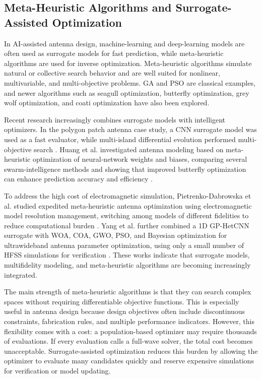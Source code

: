 \documentclass{article}
\begin{document}
\subsection{Meta-Heuristic Algorithms and Surrogate-Assisted Optimization}

In AI-assisted antenna design, machine-learning and deep-learning models are often used as surrogate models for fast prediction, while meta-heuristic algorithms are used for inverse optimization. Meta-heuristic algorithms simulate natural or collective search behavior and are well suited for nonlinear, multivariable, and multi-objective problems. GA and PSO are classical examples, and newer algorithms such as seagull optimization, butterfly optimization, grey wolf optimization, and coati optimization have also been explored.

Recent research increasingly combines surrogate models with intelligent optimizers. In the polygon patch antenna case study, a CNN surrogate model was used as a fast evaluator, while multi-island differential evolution performed multi-objective search \cite{singh2024polygon}. Huang et al. investigated antenna modeling based on meta-heuristic optimization of neural-network weights and biases, comparing several swarm-intelligence methods and showing that improved butterfly optimization can enhance prediction accuracy and efficiency \cite{huang2024meta}.

To address the high cost of electromagnetic simulation, Pietrenko-Dabrowska et al. studied expedited meta-heuristic antenna optimization using electromagnetic model resolution management, switching among models of different fidelities to reduce computational burden \cite{pietrenko2023resolution}. Yang et al. further combined a 1D GP-HetCNN surrogate with WOA, COA, GWO, PSO, and Bayesian optimization for ultrawideband antenna parameter optimization, using only a small number of HFSS simulations for verification \cite{yang2026gphercnn}. These works indicate that surrogate models, multifidelity modeling, and meta-heuristic algorithms are becoming increasingly integrated.

The main strength of meta-heuristic algorithms is that they can search complex spaces without requiring differentiable objective functions. This is especially useful in antenna design because design objectives often include discontinuous constraints, fabrication rules, and multiple performance indicators. However, this flexibility comes with a cost: a population-based optimizer may require thousands of evaluations. If every evaluation calls a full-wave solver, the total cost becomes unacceptable. Surrogate-assisted optimization reduces this burden by allowing the optimizer to evaluate many candidates quickly and reserve expensive simulations for verification or model updating.
\end{document}
